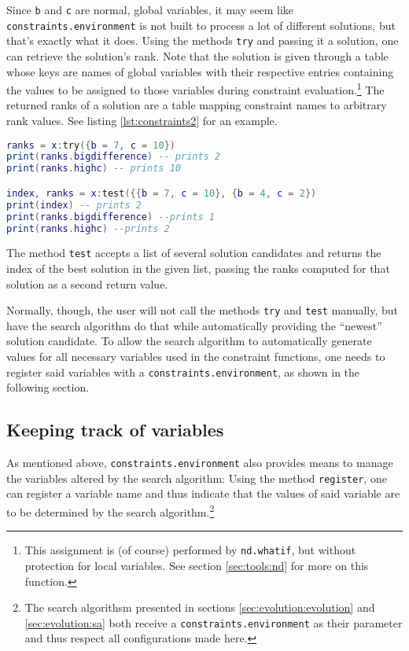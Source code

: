 Since \texttt{b} and \texttt{c} are normal, global variables, it may seem like \texttt{constraints.environment} is not built to process a lot of different solutions, but that's exactly what it does. Using the methods \texttt{try} and passing it a solution, one can retrieve the solution's rank. Note that the solution is given through a table whose keys are names of global variables with their respective entries containing the values to be assigned to those variables during constraint evaluation.\footnote{This assignment is (of course) performed by \texttt{nd.whatif}, but without protection for local variables. See section \ref{sec:tools:nd} for more on this function.} The returned ranks of a solution are a table mapping constraint names to arbitrary rank values. See listing \ref{lst:constraints2} for an example.

\begin{lstlisting}[language=lua, caption={Example usage of the method \texttt{try} (continued from listing \ref{lst:constraints1})}, label=lst:constraints2, name=lst:constraints]
ranks = x:try({b = 7, c = 10}) 
print(ranks.bigdifference) -- prints 2
print(ranks.highc) -- prints 10

index, ranks = x:test({{b = 7, c = 10}, {b = 4, c = 2})
print(index) -- prints 2
print(ranks.bigdifference) --prints 1
print(ranks.highc) --prints 2
\end{lstlisting}

The method \texttt{test} accepts a list of several solution candidates and returns the index of the best solution in the given list, passing the ranks computed for that solution as a second return value.

Normally, though, the user will not call the methods \texttt{try} and \texttt{test} manually, but have the search algorithm do that while automatically providing the  ``newest'' solution candidate. To allow the search algorithm to automatically generate values for all necessary variables used in the constraint functions, one needs to register said variables with a \texttt{constraints.environment}, as shown in the following section.


\subsection{Keeping track of variables}
\label{sec:evolution:constraints:vars}

As mentioned above, \texttt{constraints.environment} also provides means to manage the variables altered by the search algorithm: Using the method \texttt{register}, one can register a variable name and thus indicate that the values of said variable are to be determined by the search algorithm.\footnote{The search algorithsm presented in sections \ref{sec:evolution:evolution} and \ref{sec:evolution:sa} both receive a \texttt{constraints.environment} as their parameter and thus respect all configurations made here.}


